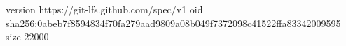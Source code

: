 version https://git-lfs.github.com/spec/v1
oid sha256:0abeb7f8594834f70fa279aad9809a08b049f7372098c41522ffa83342009595
size 22000

